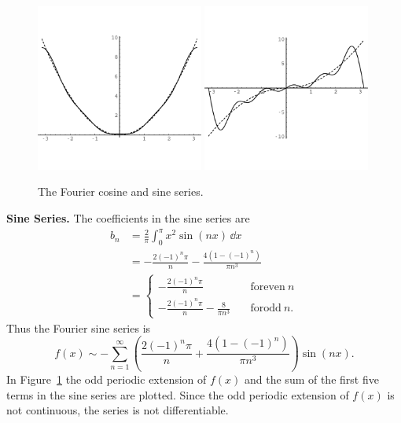 {\begin{Solution}
  \begin{figure}[h!]
    \begin{center}
      \includegraphics[width=0.49\textwidth]{ode/fourier_series/cos_xs}
      \includegraphics[width=0.49\textwidth]{ode/fourier_series/sin_xs}
    \end{center}
    \caption{The Fourier cosine and sine series.}
    \label{cos_sin_xs}
  \end{figure}


  \textbf{Sine Series.}
  The coefficients in the sine series are
  \begin{align*}
    b_n     &= \frac{2}{\pi} \int_0^\pi x^2 \sin(n x)\,\dd x \\
    &= -\frac{2(-1)^n \pi}{n} - \frac{4(1 - (-1)^n)}{\pi n^3} \\
    &=      \begin{cases}
      -\frac{2(-1)^n \pi}{n} \quad &\mathrm{for even}\ n \\
      -\frac{2(-1)^n \pi}{n} - \frac{8}{\pi n^3} \quad 
      &\mathrm{for odd}\ n.
    \end{cases}
  \end{align*}
  Thus the Fourier sine series is
  \[ f(x) \sim - \sum_{n = 1}^\infty \left(\frac{2(-1)^n \pi}{n} 
    + \frac{4(1 - (-1)^n)}{\pi n^3} \right) \sin(n x).\]
  In Figure~\ref{cos_sin_xs} the odd periodic extension of $f(x)$ and the sum
  of the first five terms in the sine series are plotted.
  Since the odd periodic extension of $f(x)$ is not continuous, the series
  is not differentiable.
\end{Solution}











}
